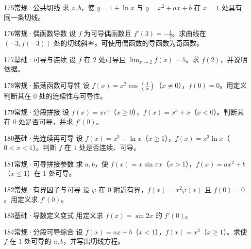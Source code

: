 \begin{exercise}{175}{常规·公共切线}
求 $a,b$，使 $y=1+\ln x$ 与 $y=x^2+ax+b$ 在 $x=1$ 处具有同一条切线。
\end{exercise}
\begin{exercise}{176}{常规·偶函数导数}
设 $f$ 为可导偶函数且 $f'(3)=-\frac{1}{2}$。求曲线在 $(-3,f(-3))$ 处的切线斜率。可使用偶函数的导函数为奇函数。
\end{exercise}
\begin{exercise}{177}{基础·可导与连续}
设 $f$ 在 $2$ 处可导且 $\lim_{x\to2}f(x)=5$。求 $f(2)$，并说明依据。
\end{exercise}
\begin{exercise}{178}{常规·振荡函数可导性}
设 $f(x)=x^2\cos(\frac{1}{x})$（$x\ne0$），$f(0)=0$。用定义判断其在 $0$ 处的连续性与可导性。
\end{exercise}
\begin{exercise}{179}{常规·分段拼接}
设 $f(x)=xe^x$（$x\ge0$），$f(x)=x^3+x$（$x<0$）。判断其在 $0$ 处是否可导，并求 $f'(0)$。
\end{exercise}
\begin{exercise}{180}{基础·先连续再可导}
设 $f(x)=x^3+\ln x$（$x\ge1$），$f(x)=x^3\ln x$（$0<x<1$）。判断 $f$ 在 $1$ 处是否连续、可导。
\end{exercise}
\begin{exercise}{181}{常规·可导拼接参数}
求 $a,b$，使 $f(x)=x\sin\pi x$（$x>1$），$f(x)=ax^2+b$（$x\le1$）在 $1$ 处可导。
\end{exercise}
\begin{exercise}{182}{常规·有界因子与可导}
设 $\varphi$ 在 $0$ 附近有界，$f(x)=x^2\varphi(x)$ 且 $f(0)=0$。用定义求 $f'(0)$。
\end{exercise}
\begin{exercise}{183}{基础·导数定义变式}
用定义求 $f(x)=\sin2x$ 的 $f'(0)$。
\end{exercise}
\begin{exercise}{184}{常规·分段可导综合}
设 $f(x)=ax+b$（$x<1$），$f(x)=x^2$（$x\ge1$）。求使 $f$ 在 $1$ 处可导的 $a,b$，并写出切线方程。
\end{exercise}
